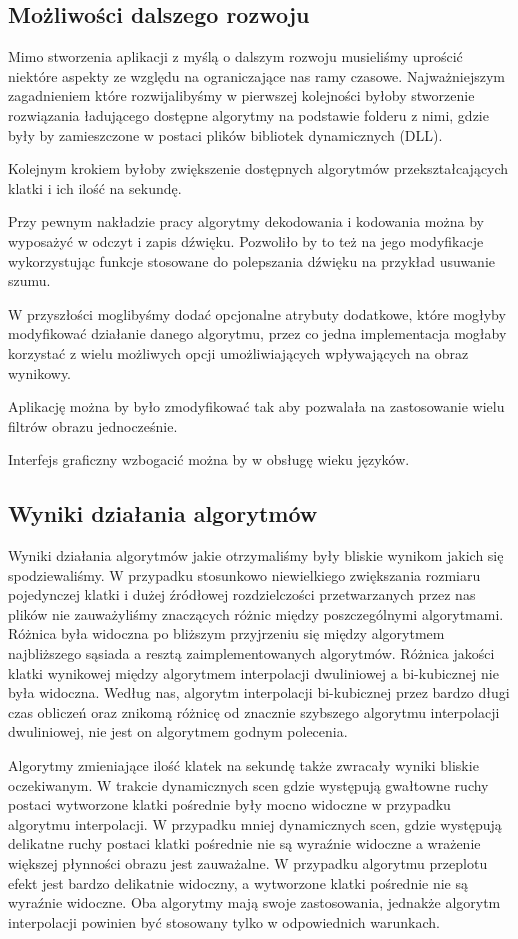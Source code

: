\documentclass[twoside]{projektInzynierskiMS}
\begin{document}
\subsection{Możliwości dalszego rozwoju}
Mimo stworzenia aplikacji z myślą o dalszym rozwoju musieliśmy uprościć niektóre aspekty ze względu na ograniczające nas ramy czasowe. Najważniejszym zagadnieniem które rozwijalibyśmy w pierwszej kolejności byłoby stworzenie rozwiązania ładującego dostępne algorytmy na podstawie folderu z nimi, gdzie były by zamieszczone w postaci plików bibliotek dynamicznych (DLL).

Kolejnym krokiem byłoby zwiększenie dostępnych algorytmów przekształcających klatki i ich ilość na sekundę.

Przy pewnym nakładzie pracy algorytmy dekodowania i kodowania można by wyposażyć w odczyt i zapis dźwięku. Pozwoliło by to też na jego modyfikacje wykorzystując funkcje stosowane do polepszania dźwięku na przykład usuwanie szumu.

W przyszłości moglibyśmy dodać opcjonalne atrybuty dodatkowe, które mogłyby modyfikować działanie danego algorytmu, przez co jedna implementacja mogłaby korzystać z wielu możliwych opcji umożliwiających wpływających na obraz wynikowy.

Aplikację można by było zmodyfikować tak aby pozwalała na zastosowanie wielu filtrów obrazu jednocześnie.

Interfejs graficzny wzbogacić można by w obsługę wieku języków.

\subsection{Wyniki działania algorytmów}
Wyniki działania algorytmów jakie otrzymaliśmy były bliskie wynikom jakich się spodziewaliśmy. W przypadku stosunkowo niewielkiego zwiększania rozmiaru pojedynczej klatki i dużej źródłowej rozdzielczości przetwarzanych przez nas plików nie zauważyliśmy znaczących różnic między poszczególnymi algorytmami. Różnica była widoczna po bliższym przyjrzeniu się między algorytmem najbliższego sąsiada a resztą zaimplementowanych algorytmów. Różnica jakości klatki wynikowej między algorytmem interpolacji dwuliniowej a bi-kubicznej nie była widoczna. Według nas, algorytm interpolacji bi-kubicznej przez bardzo długi czas obliczeń oraz znikomą różnicę od znacznie szybszego algorytmu interpolacji dwuliniowej, nie jest on algorytmem godnym polecenia.

Algorytmy zmieniające ilość klatek na sekundę także zwracały wyniki bliskie oczekiwanym. W trakcie dynamicznych scen gdzie występują gwałtowne ruchy postaci wytworzone klatki pośrednie były mocno widoczne w przypadku algorytmu interpolacji. W przypadku mniej dynamicznych scen, gdzie występują delikatne ruchy postaci klatki pośrednie nie są wyraźnie widoczne a wrażenie większej płynności obrazu jest zauważalne. W przypadku algorytmu przeplotu efekt jest bardzo delikatnie widoczny, a wytworzone klatki pośrednie nie są wyraźnie widoczne. Oba algorytmy mają swoje zastosowania, jednakże algorytm interpolacji powinien być stosowany tylko w odpowiednich warunkach.
\end{document}
